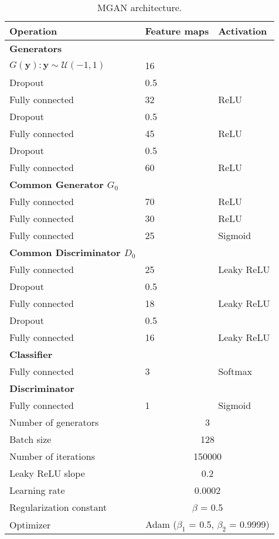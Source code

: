 \begin{table}
	\scriptsize %
	\centering
	\caption{MGAN architecture.}
	\begin{tabular}{ p{3cm}|p{1.5cm}|p{1.5cm}} 
		\toprule
		Operation & Feature maps  		& Activation  \\
		\midrule
		\textbf{Generators} & &  \\ 
		$G(\mathbf{y}):\mathbf{y} \sim \mathcal{U}(-1,1)$ & 16\\ 
		Dropout &0.5& \\ 
		Fully connected &32& ReLU \\ 
		Dropout &0.5&  \\ 
		Fully connected &45& ReLU \\ 
		Dropout &0.5&  \\ 
		Fully connected & 60 & ReLU \\  \hline
		\textbf{Common Generator $G_0$} & &  \\ 
		Fully connected & 70 & ReLU \\ 
		Fully connected & 30 & ReLU \\ 
		Fully connected & 25 & Sigmoid \\  \hline
		\textbf{Common Discriminator $D_0$} &&   \\ 
		Fully connected & 25 & Leaky ReLU  \\
		Dropout &0.5& \\
		Fully connected & 18 & Leaky ReLU \\  
		Dropout &0.5&  \\
		Fully connected & 16 & Leaky ReLU \\  \hline
		\textbf{Classifier} & &\\ 
		Fully connected & 3 & Softmax \\  \hline
		\textbf{Discriminator} & &  \\ 
		Fully connected & 1 & Sigmoid \\ \hline
		Number of generators & \multicolumn{2}{c}{3} \\
		Batch size & \multicolumn{2}{c}{128} \\
		Number of iterations & \multicolumn{2}{c}{150000} \\ 
		Leaky ReLU slope &  \multicolumn{2}{c}{0.2} \\ 
		Learning rate &  \multicolumn{2}{c}{0.0002}  \\ 
		Regularization constant &  \multicolumn{2}{c}{$\beta$ = 0.5} \\ 
		Optimizer &  \multicolumn{2}{c}{Adam ($\beta_1$ = 0.5, $\beta_2$ = 0.9999)}  \\ \hline
	\end{tabular}
	
	\label{tab:gan_nn}
\end{table}

